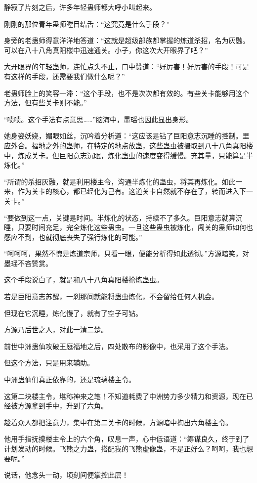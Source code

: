 \begin{this_body}
静寂了片刻之后，许多年轻蛊师都大呼小叫起来。

刚刚的那位青年蛊师瞠目结舌：“这究竟是什么手段？”

身旁的老蛊师得意洋洋地答道：“这就是超级部族都掌握的炼道杀招，名为灰融。可以在八十八角真阳楼中迅速通关。小子，你这次大开眼界了吧？”

大开眼界的年轻蛊师，连忙点头不止，口中赞道：“好厉害！好厉害的手段！可是有这样的手段，还需要我们做什么呢？”

老蛊师脸上的笑容一滞：“这个手段，也不是次次都有效的。有些关卡能够用这个方法，但有些关卡则不能。”

“啧啧。这个手法有点意思……”脑海中，墨瑶也因此显出身形。

她身姿妖娆，媚眼如丝，沉吟着分析道：“这应该是钻了巨阳意志沉睡的控制。里应外合。福地之外的蛊师，在特定的地点放蛊，这些蛊虫被摄取到八十八角真阳楼中，炼成关卡。但巨阳意志沉眠，炼化蛊虫的速度变得缓慢。充其量，只能算是半炼化。”

“所谓的杀招灰融，就是利用楼主令，沟通半炼化的蛊虫，将其再炼化。如此一来，作为关卡的核心，都已经化为己有。这道关卡自然就不存在了，转而进入下一关卡。”

“要做到这一点，关键是时间。半炼化的状态，持续不了多久。巨阳意志就算沉睡，只要时间充足，完全炼化这些蛊虫。一旦这些蛊虫被炼化，闯关的蛊师如何也感应不到，也就彻底丧失了强行炼化的可能。”

“呵呵呵，果然不愧是炼道宗师，只看一眼，便能分析得如此透彻。”方源暗笑，对墨瑶不吝赞赏。

这个手段说白了，就是和八十八角真阳楼抢炼蛊虫。

若是巨阳意志苏醒，一刹那间就能将蛊虫炼化，不会留给任何人机会。

但现在它沉睡，炼化慢了，就有了空子可钻。

方源乃后世之人，对此一清二楚。

前世中洲蛊仙攻破王庭福地之后，四处散布的影像中，也采用了这个手法。

但这个方法，只是用来辅助。

中洲蛊仙们真正依靠的，还是琉璃楼主令。

这第二块楼主令，堪称神来之笔！不知道耗费了中洲势力多少精力和资源，现在已经被方源拿到手中，升到了六角。

趁着众人都把注意力，集中在第二关卡的时候，方源暗中掏出六角楼主令。

他用手指抚摸楼主令上的六个角，叹息一声，心中低语道：“筹谋良久，终于到了计划发动的时候。飞熊之力蛊，搭配我的飞熊虚像蛊，不是正好么？呵呵，我也想要呢。”

说话，他念头一动，顷刻间便掌控此层！

\end{this_body}

